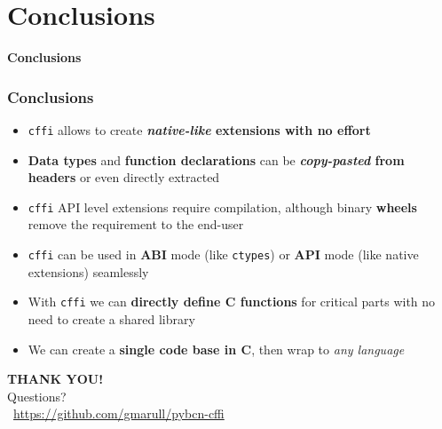 \documentclass[handout]{beamer}
\begin{document}
\section{Conclusions}

\begin{frame}[plain]{}
  \begin{center}
    \Huge \textbf{Conclusions}
  \end{center}
\end{frame}

\begin{frame}
  \frametitle{Conclusions}

  \begin{itemize}
    \item<1-> \texttt{cffi} allows to create \textbf{\textit{native-like}
      extensions with no effort}
    \item<2-> \textbf{Data types} and \textbf{function declarations} can be
      \textbf{\textit{copy-pasted} from headers} or even directly extracted
    \item<3-> \texttt{cffi} API level extensions require compilation, although
      binary \textbf{wheels} remove the requirement to the end-user
    \item<4-> \texttt{cffi} can be used in \textbf{ABI} mode (like
      \texttt{ctypes}) or \textbf{API} mode (like native extensions) seamlessly
    \item<5-> With \texttt{cffi} we can \textbf{directly define C functions} for
      critical parts with no need to create a shared library
    \item<6-> We can create a \textbf{single code base in C}, then wrap to
      \textit{any language}
  \end{itemize}
\end{frame}

\begin{frame}[c]
  \begin{center}
    \huge
    \textbf{THANK YOU!} \\
    Questions? \\
    \vspace{2cm}
    \normalsize
    \faGithub~\href{https://github.com/gmarull/pybcn-cffi}{https://github.com/gmarull/pybcn-cffi}
  \end{center}
\end{frame}
\end{document}
